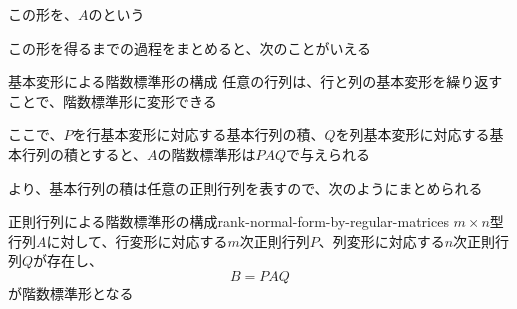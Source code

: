 \documentclass[../../../topic_linear-algebra]{subfiles}
\begin{document}
\br

この形を、$A$のという

この形を得るまでの過程をまとめると、次のことがいえる

\begin{theorem*}{基本変形による階数標準形の構成}
  任意の行列は、行と列の基本変形を繰り返すことで、階数標準形に変形できる
\end{theorem*}

\br

ここで、$P$を行基本変形に対応する基本行列の積、$Q$を列基本変形に対応する基本行列の積とすると、$A$の階数標準形は$PAQ$で与えられる

\br

より、基本行列の積は任意の正則行列を表すので、次のようにまとめられる

\begin{theorem}{正則行列による階数標準形の構成}{rank-normal-form-by-regular-matrices}
  $m \times n$型行列$A$に対して、行変形に対応する$m$次正則行列$P$、列変形に対応する$n$次正則行列$Q$が存在し、
  \begin{equation*}
    B = PAQ
  \end{equation*}
  が階数標準形となる
\end{theorem}
\end{document}
